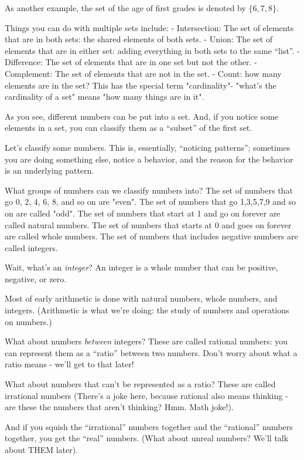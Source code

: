 As another example, the set of the age of first grades is denoted by $\{ 6, 7, 8 \}$.

Things you can do with multiple sets include:
- Intersection: The set of elements that are in both sets: the shared elements of both sets.
- Union: The set of elements that are in either set: adding everything in both sets to the same ``list''.
- Difference: The set of elements that are in one set but not the other.
- Complement: The set of elements that are not in the set.
- Count: how many elements are in the set? This has the special term "cardinality"- "what's the cardinality of a set" means "how many things are in it".


As you see, different numbers can be put into a set. And, if you notice some elements in a set, you can classify them
as a ``subset'' of the first set.

Let's classify some numbers. This is, essentially, ``noticing patterns''; sometimes you are doing
something else, notice a behavior, and the reason for the behavior is an underlying pattern.

What groups of numbers can we classify numbers into?
The set of numbers that go 0, 2, 4, 6, 8, and so on are "even".
The set of numbers that go 1,3,5,7,9 and so on are called "odd". 
The set of numbers that start at 1 and go on forever are called natural numbers.
The set of numbers that starts at 0 and goes on forever are called whole numbers.
The set of numbers that includes negative numbers are called integers.

Wait, what's an \textit{integer}? An integer is a whole number that can be positive, negative, or zero.

Most of early arithmetic is done with natural numbers, whole numbers, and integers. (Arithmetic is what we're doing: the study of numbers and operations on numbers.)


What about numbers \textit{between} integers? These are called rational numbers: you can represent them as
a ``ratio'' between two numbers.
Don't worry about what a ratio means - we'll get to that later!

What about numbers that can't be represented as a ratio? These are called irrational numbers (There's a joke here, because rational also means thinking - are these the numbers that aren't thinking? Hmm. Math joke!).

And if you squish the ``irrational'' numbers together and the ``rational'' numbers together, you get the ``real'' numbers. (What about unreal numbers? We'll talk about THEM later).

